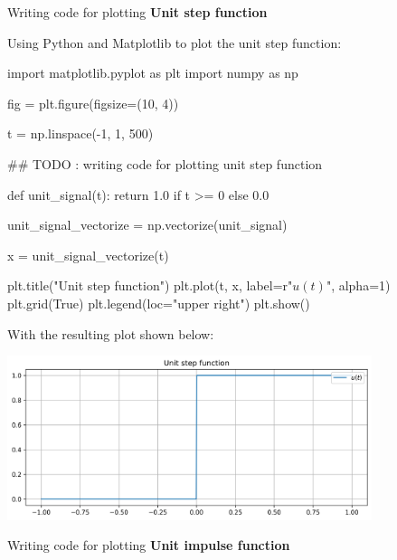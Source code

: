 \documentclass[a4paper, 10pt]{article}
\begin{document}
\begin{subproblems}
    \item Writing code for plotting \textbf{Unit step function}
\end{subproblems}

\begin{solution}
Using Python and Matplotlib to plot the unit step function:
\begin{codingbox}
import matplotlib.pyplot as plt
import numpy as np

fig = plt.figure(figsize=(10, 4))

t = np.linspace(-1, 1, 500)

## TODO : writing code for plotting unit step function

def unit_signal(t):
    return 1.0 if t >= 0 else 0.0

unit_signal_vectorize = np.vectorize(unit_signal)

x = unit_signal_vectorize(t)

plt.title("Unit step function")
plt.plot(t, x, label=r"$u(t)$", alpha=1)
plt.grid(True)
plt.legend(loc="upper right")
plt.show()
\end{codingbox}

With the resulting plot shown below:
\begin{center}
    \includegraphics[width=0.8\textwidth]{images/problem_7_1.png}
\end{center}
\end{solution}

\newpage

\begin{subproblems}[start=2]
    \item Writing code for plotting \textbf{Unit impulse function}
\end{subproblems}
\end{document}
